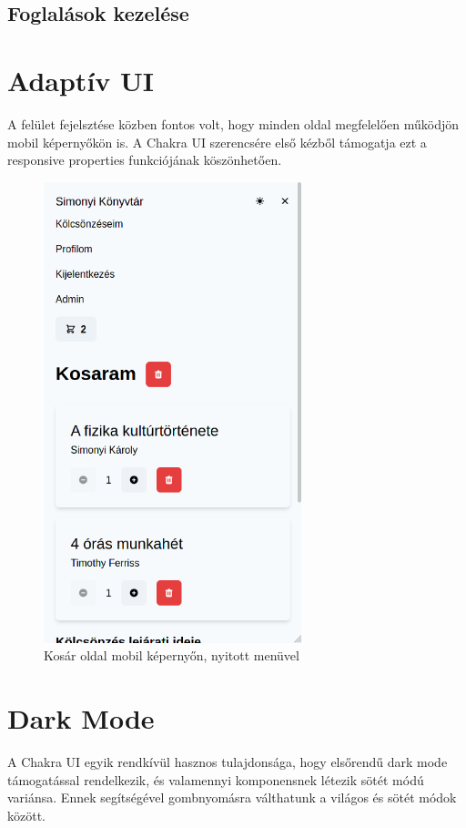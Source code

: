 \subsection{Foglalások kezelése}

\section{Adaptív UI}

A felület fejelsztése közben fontos volt, hogy minden oldal megfelelően működjön mobil képernyőkön is.
A Chakra UI szerencsére első kézből támogatja ezt a responsive properties funkciójának köszönhetően.

\begin{figure}[!ht]
  \centering
  \includegraphics[width=75mm, keepaspectratio]{figures/cart-mobile.png}
  \caption{Kosár oldal mobil képernyőn, nyitott menüvel}
  \label{fig:CartMobile}
\end{figure}

\section{Dark Mode}

A Chakra UI egyik rendkívül hasznos tulajdonsága, hogy elsőrendű dark mode támogatással rendelkezik, és valamennyi komponensnek
létezik sötét módú variánsa.
Ennek segítségével gombnyomásra válthatunk a világos és sötét módok között.

